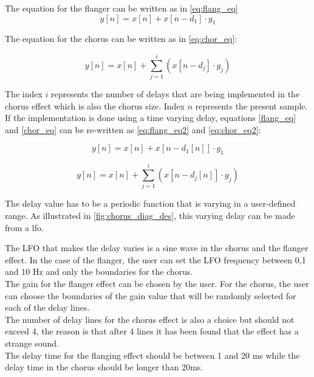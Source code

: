 The equation for the flanger can be written as in \autoref{eq:flang_eq}
\begin{equation}
\label{eq:flang_eq}
		y[n] = x[n] + x[n- d_{1}] \cdot g_{1}  
\end{equation}

The equation for the chorus can be written as in \autoref{eq:chor_eq}:

\begin{equation}
\label{eq:chor_eq}
y[n] = x[n] + \sum_{j=1}^{i}  (x[n- d_{j}] \cdot g_{j})
\end{equation}

The index $i$ represents the number of delays that are being implemented in the chorus effect which is also the chorus size. Index $n$ represents the present sample. \\
If the implementation is done using a time varying delay, equations \ref{flang_eq} and \ref{chor_eq} can be re-written as \autoref{eq:flang_eq2} and \autoref{eq:chor_eq2}:

\begin{equation}
\label{eq:flang_eq2}
y[n] = x[n] + x[n- d_{1}[n]] \cdot g_{1}  
\end{equation}

\begin{equation}
\label{eq:chor_eq2}
y[n] = x[n] + \sum_{j=1}^{i}  (x[n- d_{j}[n]] \cdot g_{j})
\end{equation}

The delay value has to be a periodic function that is varying in a user-defined range. As illustrated in \autoref{fig:chorus_diag_des}, this varying delay can be made from a \gls{lfo}.

The LFO that makes the delay varies is a sine wave in the chorus and the flanger effect. In the case of the flanger, the user can set the LFO frequency between 0,1 and 10 Hz and only the boundaries for the chorus. \\

The gain for the flanger effect can be chosen by the user. For the chorus, the user can choose the boundaries of the gain value that will be randomly selected for each of the delay lines. \\

The number of delay lines for the chorus effect is also a choice but should not exceed 4, the reason is that after 4 lines it has been found that the effect has a strange sound. \\

The delay time for the flanging effect should be between 1 and 20 ms while the delay time in the chorus should be longer than 20ms. \\

